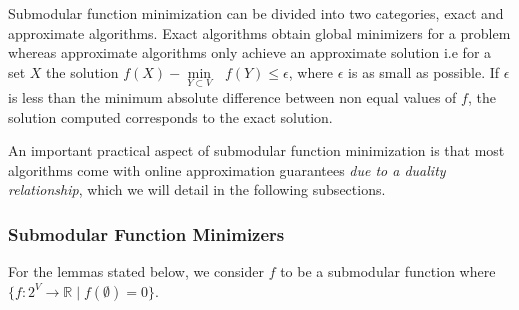 Submodular function minimization can be divided into two categories, exact and approximate algorithms. Exact algorithms obtain global minimizers for a problem whereas approximate algorithms only achieve an approximate solution i.e for a set $X$ the solution $f(X) - \underset{Y \subset V}{\operatorname{min }}\text{ } f(Y) \leq \epsilon $, where $\epsilon$ is as small as possible. If $\epsilon$ is less than the minimum absolute difference between non equal values of $f$, the solution computed corresponds to the exact solution.

An important practical aspect of submodular function minimization is that most algorithms come with online approximation guarantees {\it due to a duality relationship}, which we will detail in the following subsections.\\

\subsubsection{\bf Submodular Function Minimizers}
For the lemmas stated below, we consider $f$ to be a submodular function where $\{f:2^V \rightarrow \mathds{R} \mid f(\emptyset) = 0\}$.\\

